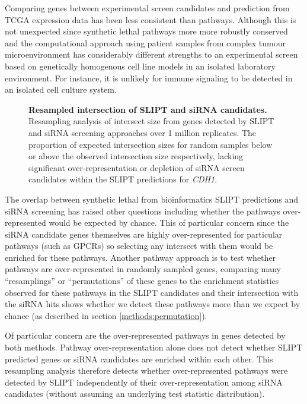 Comparing genes between experimental screen candidates and prediction from TCGA expression data has been less consistent than pathways. Although this is not unexpected since synthetic lethal pathways more more robustly conserved \citep{Dixon2008} and the computational approach using patient samples from complex tumour microenvironment has considerably different strengths to an experimental screen \citep{Telford2015} based on genetically homogenous cell line models in an isolated laboratory environment. For instance, it is unlikely for immune signaling to be detected in an isolated cell culture system.

\begin{figure}[!ht]
\begin{mdframed}
  \centering
   \caption[Resampled intersection of SLIPT and siRNA candidates]{\small \textbf{Resampled intersection of SLIPT and siRNA candidates.} Resampling analysis of intersect size from genes detected by SLIPT and siRNA screening approaches over 1 million replicates. The proportion of expected intersection sizes for random samples below or above the observed intersection size respectively, lacking significant over-represent\-ation or depletion of siRNA screen candidates within the SLIPT predictions for \textit{CDH1}.
}
\label{fig:perm_sample}
\end{mdframed}
\end{figure}

The overlap between synthetic lethal from bioinformatics SLIPT predictions and siRNA screening has raised other questions including whether the pathways over-represented would be expected by chance. This of particular concern since the siRNA candidate genes themselves are highly over-represented for particular pathways (such as GPCRs) so selecting any intersect with them would be enriched for these pathways. Another pathway approach is to test whether pathways are over-represented in randomly sampled genes, comparing many ``resamplings'' or ``permutations'' of these genes to the enrichment statistics observed for these pathways in the SLIPT candidates and their intersection with the siRNA hits shows whether we detect these pathways more than we expect by chance (as described in section \ref{methods:permutation}). 

Of particular concern are the over-represented pathways in genes detected by both methods. Pathway over-representation alone does not detect whether SLIPT predicted genes or siRNA candidates are enriched within each other. This resampling analysis therefore detects whether over-represented pathways were detected by SLIPT independently of their over-representation among siRNA candidates (without assuming an underlying test statistic distribution).

